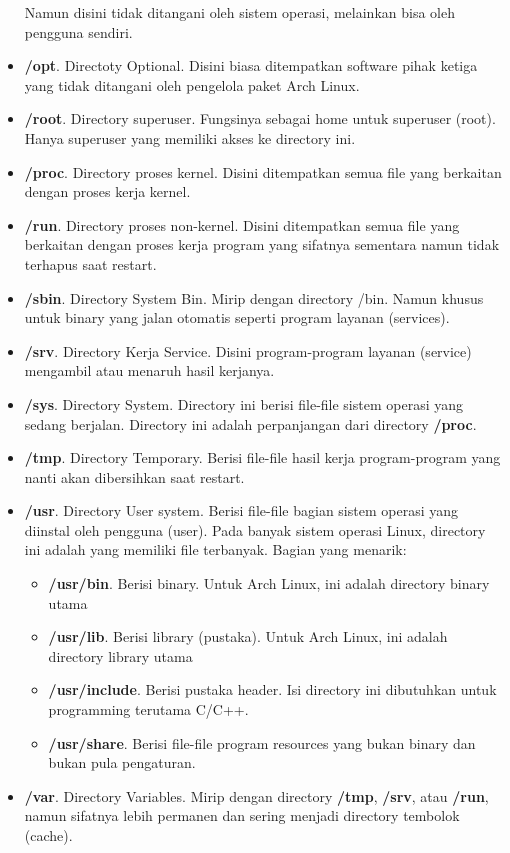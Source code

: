 \documentclass[12pt,]{article}
\begin{document}
\begin{itemize}
		Namun disini tidak ditangani oleh sistem operasi, melainkan bisa oleh pengguna sendiri.
		\item \textbf{/opt}. Directoty Optional.
		Disini biasa ditempatkan software pihak ketiga yang tidak ditangani oleh pengelola paket Arch Linux.
		\item \textbf{/root}. Directory superuser. Fungsinya sebagai home untuk superuser (root).
		Hanya superuser yang memiliki akses ke directory ini.
		\item \textbf{/proc}. Directory proses kernel. Disini ditempatkan semua file yang berkaitan dengan proses kerja kernel.
		\item \textbf{/run}. Directory proses non-kernel.
		Disini ditempatkan semua file yang berkaitan dengan proses kerja program yang sifatnya sementara namun tidak terhapus saat restart.		
		\item \textbf{/sbin}. Directory System Bin. Mirip dengan directory /bin.
		Namun khusus untuk binary yang jalan otomatis seperti program layanan (services).
		\item \textbf{/srv}. Directory Kerja Service. Disini program-program layanan (service) mengambil atau menaruh hasil kerjanya.
		\item \textbf{/sys}. Directory System. Directory ini berisi file-file sistem operasi yang sedang berjalan.
		Directory ini adalah perpanjangan dari directory \textbf{/proc}.
		\item \textbf{/tmp}. Directory Temporary. Berisi file-file hasil kerja program-program yang nanti akan dibersihkan saat restart.
		\item \textbf{/usr}. Directory User system. Berisi file-file bagian sistem operasi yang diinstal oleh pengguna (user).
		Pada banyak sistem operasi Linux, directory ini adalah yang memiliki file terbanyak. Bagian yang menarik:
		\begin{itemize}
			\item \textbf{/usr/bin}. Berisi binary. Untuk Arch Linux, ini adalah directory binary utama
			\item \textbf{/usr/lib}. Berisi library (pustaka). Untuk Arch Linux, ini adalah directory library utama
			\item \textbf{/usr/include}. Berisi pustaka header. Isi directory ini dibutuhkan untuk programming terutama C/C++.
			\item \textbf{/usr/share}. Berisi file-file program resources yang bukan binary dan bukan pula pengaturan.
		\end{itemize}
		\item \textbf{/var}. Directory Variables. Mirip dengan directory \textbf{/tmp}, \textbf{/srv}, atau \textbf{/run},
		namun sifatnya lebih permanen dan sering menjadi directory tembolok (cache).
	\end{itemize}
	
\end{document}
